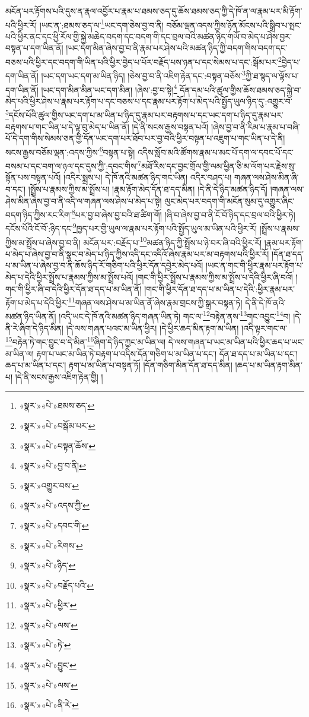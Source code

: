 མངོན་པར་རྟོགས་པའི་དུས་ན་རྣལ་འབྱོར་པ་རྣམ་པ་ཐམས་ཅད་དུ་ཆོས་ཐམས་ཅད་ཀྱི་དེ་ཁོ་ན་ལ་རྣམ་པར་མི་རྟོག་པའི་ཕྱིར་རོ། །ཡང་ན་:ཐམས་ཅད་ལ་\footnote{«སྣར་»«པེ་»ཐམས་ཅད་}ཡང་དག་ཅེས་བྱ་བ་ནི། བཅོམ་ལྡན་འདས་ཀྱིས་ཉོན་མོངས་པའི་སྒྲིབ་པ་སྤང་པའི་ཕྱིར་ནང་དང་ཕྱི་རོལ་གྱི་སྐྱེ་མཆེད་བདག་དང་བདག་གི་དང་བྲལ་བའི་མཚན་ཉིད་གཡོ་བ་མེད་པ་ཤེས་བྱར་བསྟན་པ་དག་ཡིན་ནོ། །ཡང་དག་མིན་ཞེས་བྱ་བ་ནི་རྣམ་པར་ཤེས་པའི་མཚན་ཉིད་ཀྱི་བདག་གིས་བདག་དང་བཅས་པའི་ཕྱིར་དང་བདག་གི་ཡིན་པའི་ཕྱིར་བྱེད་པ་པོར་བརྗོད་པས་ཉན་པ་དང་སེམས་པ་དང་:སྒོམ་པར་\footnote{«སྣར་»«པེ་»བསྒོམ་པར་}བྱེད་པ་དག་ཡིན་ནོ། །ཡང་དག་ཡང་དག་མ་ཡིན་ཉིད། །ཅེས་བྱ་བ་ནི་འཇིག་རྟེན་དང་:བསྟན་བཅོས་\footnote{«སྣར་»«པེ་»བསྟན་ཆོས་}ཀྱི་ཐ་སྙད་ལ་ལྟོས་པ་དག་ཡིན་ནོ། །ཡང་དག་མིན་མིན་ཡང་དག་མིན། །ཞེས་:བྱ་བ་སྟེ།\footnote{«སྣར་»«པེ་»བྱ་བ་ནི།} དོན་དམ་པའི་ཚུལ་གྱིས་ཆོས་ཐམས་ཅད་སྐྱེ་བ་མེད་པའི་ཕྱིར་ཤེས་པ་རྣམ་པར་རྟོག་པ་དང་བཅས་པ་དང་རྣམ་པར་རྟོག་པ་མེད་པའི་སྤྱོད་ཡུལ་ཉིད་དུ་:འགྱུར་བ་\footnote{«སྣར་»འགྱུར་བས་}དངོས་པོའི་ཚུལ་གྱིས་ཡང་དག་པ་མ་ཡིན་པ་ཉིད་དུ་རྣམ་པར་བརྟགས་པ་དང་ཡང་དག་པ་ཉིད་དུ་རྣམ་པར་བརྟགས་པ་གང་ཡིན་པ་དེ་ལྟ་བུ་མེད་པ་ཡིན་ནོ། །དེ་ནི་སངས་རྒྱས་བསྟན་པའོ། །ཞེས་བྱ་བ་ནི་རིམ་པ་རྣམ་པ་བཞི་པོ་དེ་དག་གིས་སེམས་ཅན་གྱི་དོན་ཡང་དག་པར་ཐོབ་པར་བྱ་བའི་ཕྱིར་བསྟན་པ་འཇུག་པ་གང་ཡིན་པ་དེ་ནི། སངས་རྒྱས་བཅོམ་ལྡན་:འདས་ཀྱིས་\footnote{«སྣར་»«པེ་»འདས་ཀྱི་}བསྟན་པ་སྟེ། འདིས་སློབ་མའི་ཚོགས་རྣམ་པ་མང་པོ་དག་ལ་དབང་པོ་དང་བསམ་པ་དང་བག་ལ་ཉལ་དང་དུས་ཀྱི་:དབང་གིས་\footnote{«སྣར་»«པེ་»དབང་གི་}མཐོ་རིས་དང་བྱང་གྲོལ་གྱི་ལམ་ཕྱིན་ཅི་མ་ལོག་པར་རྗེས་སུ་སྟོན་པས་བསྟན་པའོ། །འདིར་སྨྲས་པ། དེ་ཁོ་ནའི་མཚན་ཉིད་གང་ཡིན། འདིར་བཤད་པ། གཞན་ལས་ཤེས་མིན་ཞི་བ་དང་། །སྤྲོས་པ་རྣམས་ཀྱིས་མ་སྤྲོས་པ། །རྣམ་རྟོག་མེད་དོན་ཐ་དད་མིན། །དེ་ནི་དེ་ཉིད་མཚན་ཉིད་དོ། །གཞན་ལས་ཤེས་མིན་ཞེས་བྱ་བ་ནི་འདི་ལ་གཞན་ལས་ཤེས་པ་མེད་པ་སྟེ། ལུང་མེད་པར་བདག་གི་མངོན་སུམ་དུ་འགྱུར་ཞིང་བདག་ཉིད་ཀྱིས་རང་རིག་\footnote{«སྣར་»«པེ་»རིགས་}པར་བྱ་བ་ཞེས་བྱ་བའི་ཐ་ཚིག་གོ། །ཞི་བ་ཞེས་བྱ་བ་ནི་ངོ་བོ་ཉིད་དང་བྲལ་བའི་ཕྱིར་ཏེ། དངོས་པོའི་ངོ་བོ་:ཉིད་དང་\footnote{«སྣར་»«པེ་»ཉིད་}ཁྱད་པར་གྱི་ཡུལ་ལ་རྣམ་པར་རྟོག་པའི་སྤྱོད་ཡུལ་མ་ཡིན་པའི་ཕྱིར་རོ། །སྤྲོས་པ་རྣམས་ཀྱིས་མ་སྤྲོས་པ་ཞེས་བྱ་བ་ནི། མངོན་པར་:བརྗོད་པ་\footnote{«སྣར་»«པེ་»བརྗོད་པའི་}མཚན་ཉིད་ཀྱི་སྤྲོས་པ་ཉེ་བར་ཞི་བའི་ཕྱིར་རོ། །རྣམ་པར་རྟོག་པ་མེད་པ་ཞེས་བྱ་བ་ནི་སྣང་བ་མེད་པ་ཉིད་ཀྱིས་འདི་དང་འདིའོ་ཞེས་རྣམ་པར་མ་བརྟགས་པའི་ཕྱིར་རོ། །དོན་ཐ་དད་པ་མ་ཡིན་པ་ཞེས་བྱ་བ་ནི་ཆོས་ཉིད་རོ་གཅིག་པའི་ཕྱིར་དོན་དབྱེར་མེད་པའོ། །ཡང་ན་གང་གི་ཕྱིར་རྣམ་པར་རྟོག་པ་མེད་པ་དེའི་ཕྱིར་སྤྲོས་པ་རྣམས་ཀྱིས་མ་སྤྲོས་པའོ། །གང་གི་ཕྱིར་སྤྲོས་པ་རྣམས་ཀྱིས་མ་སྤྲོས་པ་དེའི་ཕྱིར་ཞི་བའོ། །གང་གི་ཕྱིར་ཞི་བ་དེའི་ཕྱིར་དོན་ཐ་དད་པ་མ་ཡིན་ནོ། །གང་གི་ཕྱིར་དོན་ཐ་དད་པ་མ་ཡིན་པ་དེའི་:ཕྱིར་རྣམ་པར་རྟོག་པ་མེད་པ་དེའི་ཕྱིར་\footnote{«སྣར་»«པེ་»ཕྱིར་}གཞན་ལས་ཤེས་པ་མ་ཡིན་ནོ་ཞེས་རྣམ་གྲངས་ཀྱི་སྒྲར་བསྟན་ཏེ། དེ་ནི་དེ་ཁོ་ནའི་མཚན་ཉིད་ཡིན་ནོ། །འདི་ཡང་དེ་ཁོ་ནའི་མཚན་ཉིད་གཞན་ཡིན་ཏེ། གང་ལ་\footnote{«སྣར་»«པེ་»ལས་}བརྟེན་ནས་\footnote{«སྣར་»«པེ་»ཏེ་}གང་འབྱུང་\footnote{«སྣར་»«པེ་»བྱུང་}བ། །དེ་ནི་རེ་ཞིག་དེ་ཉིད་མིན། །དེ་ལས་གཞན་པའང་མ་ཡིན་ཕྱིར། །དེ་ཕྱིར་ཆད་མིན་རྟག་མ་ཡིན། །འདི་ལྟར་གང་ལ་\footnote{«སྣར་»«པེ་»ལས་}བརྟེན་ཏེ་གང་བྱུང་བ་དེ་མིན་\footnote{«སྣར་»«པེ་»ནི་རེ་}ཞིག་དེ་ཉིད་ཀྱང་མ་ཡིན་ལ། དེ་ལས་གཞན་པ་ཡང་མ་ཡིན་པའི་ཕྱིར་ཆད་པ་ཡང་མ་ཡིན་ལ། རྟག་པ་ཡང་མ་ཡིན་ཏེ་བརྟག་པ་འདིས་དོན་གཅིག་པ་མ་ཡིན་པ་དང་། དོན་ཐ་དད་པ་མ་ཡིན་པ་དང་། ཆད་པ་མ་ཡིན་པ་དང་། རྟག་པ་མ་ཡིན་པ་བསྟན་ཏོ། །དོན་གཅིག་མིན་དོན་ཐ་དད་མིན། །ཆད་པ་མ་ཡིན་རྟག་མིན་པ། །དེ་ནི་སངས་རྒྱས་འཇིག་རྟེན་གྱི། །
